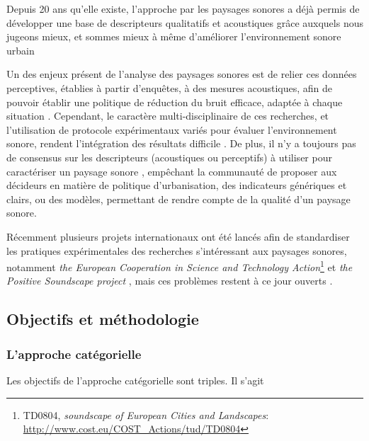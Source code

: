 Depuis 20 ans qu'elle existe, l'approche par les paysages sonores a déjà permis de développer une base de descripteurs qualitatifs et acoustiques grâce auxquels nous jugeons mieux, et sommes mieux à même d'améliorer l'environnement sonore urbain  \citep{kang2006urban,schulte2007soundscape}

Un des enjeux présent de l'analyse des paysages sonores est de relier ces données perceptives, établies à partir d'enquêtes, à des mesures acoustiques, afin de pouvoir établir une politique de réduction du bruit efficace, adaptée à chaque situation \citep{schulte2013soundscape}.
Cependant, le caractère multi-disciplinaire de ces recherches, et l'utilisation de protocole expérimentaux variés pour évaluer l'environnement sonore, rendent l’intégration des résultats difficile \citep{davies2013perception}. De plus, il n'y a toujours pas de consensus sur les descripteurs (acoustiques ou perceptifs) à utiliser pour caractériser un paysage sonore \citep{brocolini2012prediction,aletta2016soundscape}, empêchant la communauté de proposer aux décideurs en matière de politique d'urbanisation, des indicateurs génériques et clairs, ou des modèles, permettant de rendre compte de la qualité d'un paysage sonore.

Récemment plusieurs projets internationaux ont été lancés afin de standardiser les pratiques expérimentales des recherches s’intéressant aux paysages sonores, notamment \emph{ the European Cooperation in Science and Technology Action}\footnote{TD0804, \emph{soundscape of European Cities and Landscapes}: \url{http://www.cost.eu/COST_Actions/tud/TD0804}} \citep{schulte2010soundscape} et \emph{the Positive Soundscape project} \citep{salford2106,davies2013perception}, mais ces problèmes restent à ce jour ouverts \citep{schulte2013soundscape,ribeiro2013heart}.

\subsection{Objectifs et méthodologie}


\subsubsection{L'approche catégorielle}
\label{sec:appCategorielle}

Les objectifs de l'approche catégorielle sont triples. Il s'agit 

